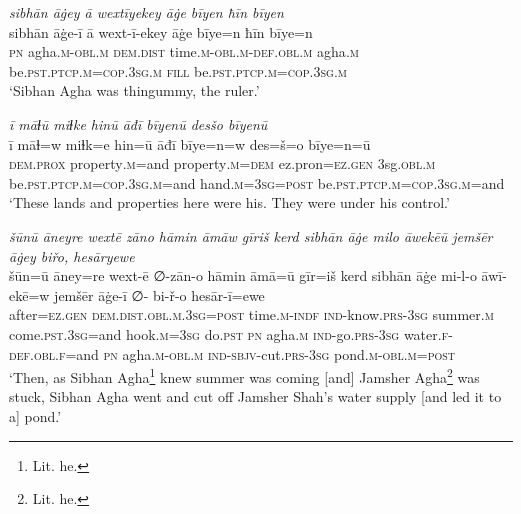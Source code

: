 \ea \label{DP.26}
\textit{sibhān āġey ā wextīyekey āġe bīyen ħīn bīyen} \\ 
\gll sibhān āġe-ī ā wext-ī-ekey āġe bīye=n ħīn bīye=n \\ 
 \textsc{pn} agha\textsc{.m}\textsc{-obl}\textsc{.m} \textsc{dem.dist} time\textsc{.m}\textsc{-obl}\textsc{.m}\textsc{-def}\textsc{.obl}\textsc{.m} agha\textsc{.m} be\textsc{.pst}\textsc{.ptcp}\textsc{.m}\textsc{=cop}\textsc{.3sg}\textsc{.m} \textsc{fill} be\textsc{.pst}\textsc{.ptcp}\textsc{.m}\textsc{=cop}\textsc{.3sg}\textsc{.m} \\ 
\glt `Sibhan Agha was thingummy, the ruler.'
\z 
 
\ea \label{DP.28}
\textit{ī māɫū miɫke hinū āđī bīyenū desšo bīyenū} \\ 
\gll ī māɫ=w miɫk=e hin=ū āđī bīye=n=w des=š=o bīye=n=ū \\ 
 \textsc{dem.prox} property\textsc{.m}=and property\textsc{.m}\textsc{=dem} ez.pron\textsc{=ez}\textsc{.gen} 3sg\textsc{.obl}\textsc{.m} be\textsc{.pst}\textsc{.ptcp}\textsc{.m}\textsc{=cop}\textsc{.3sg}\textsc{.m}=and hand\textsc{.m}\textsc{=3sg}\textsc{=\textsc{post}} be\textsc{.pst}\textsc{.ptcp}\textsc{.m}\textsc{=cop}\textsc{.3sg}\textsc{.m}=and \\ 
\glt `These lands and properties here were his. They were under his control.'
\z 
 
\ea \label{DP.30}
\textit{šūnū āneyre wextē zāno hāmin āmāw gīriš kerd sibhān āġe milo āwekēū jemšēr āġey biřo, hesāryewe} \\ 
\gll šūn=ū āney=re wext-ē ∅-zān-o hāmin āmā=ū gīr=iš kerd sibhān āġe mi-l-o āwī-ekē=w jemšēr āġe-ī ∅- bi-ř-o hesār-ī=ewe \\ 
 after\textsc{=ez}\textsc{.gen} \textsc{dem.dist}\textsc{.obl}\textsc{.m}\textsc{.3sg}\textsc{=\textsc{post}} time\textsc{.m}\textsc{-indf} \textsc{ind-}know\textsc{.prs}\textsc{-3sg} summer\textsc{.m} come\textsc{.pst}\textsc{.3sg}=and hook\textsc{.m}\textsc{=3sg} do\textsc{.pst} \textsc{pn} agha\textsc{.m} \textsc{ind-}go\textsc{.prs}\textsc{-3sg} water\textsc{\textsc{.f}}\textsc{-def}\textsc{.obl}\textsc{\textsc{.f}}=and \textsc{pn} agha\textsc{.m}\textsc{-obl}\textsc{.m} \textsc{ind-}\textsc{sbjv-}cut\textsc{.prs}\textsc{-3sg} pond\textsc{.m}\textsc{-obl}\textsc{.m}\textsc{=\textsc{post}} \\ 
\glt `Then, as Sibhan Agha\footnote{Lit. he.} knew summer was coming [and] Jamsher Agha\footnote{Lit. he.} was stuck, Sibhan Agha went and cut off Jamsher Shah’s water supply [and led it to a] pond.'
\z 
 
